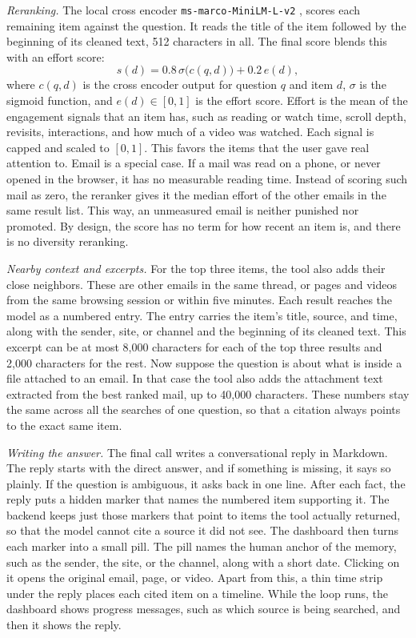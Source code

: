\documentclass[conference]{IEEEtran}
\newcommand{\rerankmodel}{\texttt{ms\allowbreak-marco\allowbreak-MiniLM\allowbreak-L\allowbreak-6\allowbreak-v2}}
\begin{document}
\textit{Reranking.} The local cross encoder \rerankmodel{} \cite{b10}, \cite{b11} scores each remaining item against the question. It reads the title of the item followed by the beginning of its cleaned text, 512 characters in all. The final score blends this with an effort score:
\begin{equation}
s(d) = 0.8\,\sigma\big(c(q,d)\big) + 0.2\,e(d), \label{eq:final}
\end{equation}
where $c(q,d)$ is the cross encoder output for question $q$ and item $d$, $\sigma$ is the sigmoid function, and $e(d) \in [0,1]$ is the effort score. Effort is the mean of the engagement signals that an item has, such as reading or watch time, scroll depth, revisits, interactions, and how much of a video was watched. Each signal is capped and scaled to $[0,1]$. This favors the items that the user gave real attention to. Email is a special case. If a mail was read on a phone, or never opened in the browser, it has no measurable reading time. Instead of scoring such mail as zero, the reranker gives it the median effort of the other emails in the same result list. This way, an unmeasured email is neither punished nor promoted. By design, the score has no term for how recent an item is, and there is no diversity reranking.

\textit{Nearby context and excerpts.} For the top three items, the tool also adds their close neighbors. These are other emails in the same thread, or pages and videos from the same browsing session or within five minutes. Each result reaches the model as a numbered entry. The entry carries the item's title, source, and time, along with the sender, site, or channel and the beginning of its cleaned text. This excerpt can be at most 8,000 characters for each of the top three results and 2,000 characters for the rest. Now suppose the question is about what is inside a file attached to an email. In that case the tool also adds the attachment text extracted from the best ranked mail, up to 40,000 characters. These numbers stay the same across all the searches of one question, so that a citation always points to the exact same item.

\textit{Writing the answer.} The final call writes a conversational reply in Markdown. The reply starts with the direct answer, and if something is missing, it says so plainly. If the question is ambiguous, it asks back in one line. After each fact, the reply puts a hidden marker that names the numbered item supporting it. The backend keeps just those markers that point to items the tool actually returned, so that the model cannot cite a source it did not see. The dashboard then turns each marker into a small pill. The pill names the human anchor of the memory, such as the sender, the site, or the channel, along with a short date. Clicking on it opens the original email, page, or video. Apart from this, a thin time strip under the reply places each cited item on a timeline. While the loop runs, the dashboard shows progress messages, such as which source is being searched, and then it shows the reply.
\end{document}
